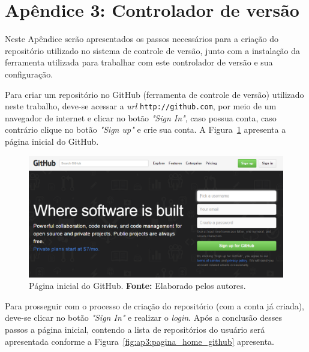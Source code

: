 \chapter*{Apêndice 3: Controlador de versão}
\label{ap3:github}

Neste Apêndice serão apresentados os passos necessários para a criação do repositório utilizado no sistema de controle de versão, junto com a instalação da ferramenta utilizada para trabalhar com este controlador de versão e sua configuração.

Para criar um repositório no GitHub (ferramenta de controle de versão) utilizado neste trabalho, deve-se acessar a  \textit{url} \texttt{http://github.com}, por meio de um navegador de internet e clicar no botão \textit{"Sign In"}, caso possua conta, caso contrário clique no botão \textit{"Sign up"} e crie sua conta. A Figura~\ref{fig:ap3:pagina_inicial_github} apresenta a página inicial do GitHub.

\captionsetup[figure]{list=no}
\begin{figure}[h!]
	\centerline{\includegraphics[scale=0.5]{./imagens/apendices/pagina-inicial-github.png}}
	\caption[Página inicial do GitHub.]
	{Página inicial do GitHub. \textbf{Fonte:} Elaborado pelos autores.}
	\label{fig:ap3:pagina_inicial_github}
\end{figure}

Para prosseguir com o processo de criação do repositório (com a conta já criada), deve-se clicar no botão \textit{"Sign In"} e realizar o \textit{login}. Após a conclusão desses passos a página inicial, contendo a lista de repositórios do usuário será apresentada conforme a Figura~\ref{fig:ap3:pagina_home_github} apresenta.


